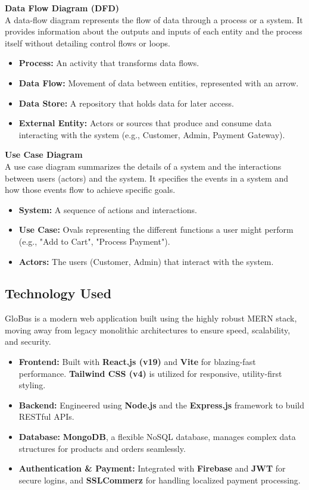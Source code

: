 \textbf{Data Flow Diagram (DFD)}\\
A data-flow diagram represents the flow of data through a process or a system. It provides information about the outputs and inputs of each entity and the process itself without detailing control flows or loops.
\begin{itemize}
    \item \textbf{Process:} An activity that transforms data flows.
    \item \textbf{Data Flow:} Movement of data between entities, represented with an arrow.
    \item \textbf{Data Store:} A repository that holds data for later access.
    \item \textbf{External Entity:} Actors or sources that produce and consume data interacting with the system (e.g., Customer, Admin, Payment Gateway).
\end{itemize}

\textbf{Use Case Diagram}\\
A use case diagram summarizes the details of a system and the interactions between users (actors) and the system. It specifies the events in a system and how those events flow to achieve specific goals.
\begin{itemize}
    \item \textbf{System:} A sequence of actions and interactions.
    \item \textbf{Use Case:} Ovals representing the different functions a user might perform (e.g., "Add to Cart", "Process Payment").
    \item \textbf{Actors:} The users (Customer, Admin) that interact with the system.
\end{itemize}

\subsection{Technology Used}
GloBus is a modern web application built using the highly robust MERN stack, moving away from legacy monolithic architectures to ensure speed, scalability, and security.
\begin{itemize}
    \item \textbf{Frontend:} Built with \textbf{React.js (v19)} and \textbf{Vite} for blazing-fast performance. \textbf{Tailwind CSS (v4)} is utilized for responsive, utility-first styling.
    \item \textbf{Backend:} Engineered using \textbf{Node.js} and the \textbf{Express.js} framework to build RESTful APIs.
    \item \textbf{Database:} \textbf{MongoDB}, a flexible NoSQL database, manages complex data structures for products and orders seamlessly.
    \item \textbf{Authentication \& Payment:} Integrated with \textbf{Firebase} and \textbf{JWT} for secure logins, and \textbf{SSLCommerz} for handling localized payment processing.
\end{itemize}

